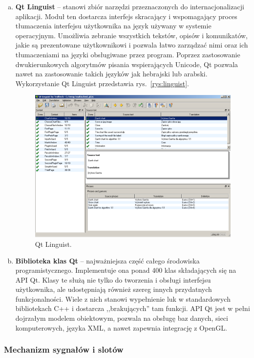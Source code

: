 \begin{enumerate}[a)]
	\item \textbf{Qt Linguist} -- stanowi zbiór narzędzi przeznaczonych do internacjonalizacji aplikacji. Moduł ten dostarcza interfejs skracający i wspomagający 
	proces tłumaczenia interfejsu użytkownika na język używany w systemie operacyjnym. Umożliwia zebranie wszystkich tekstów, opisów i komunikatów, 
	jakie są prezentowane użytkownikowi i pozwala łatwo zarządzać nimi oraz ich tłumaczeniami na języki obsługiwane przez program. Poprzez zastosowanie 
	dwukierunkowych algorytmów pisania wspierających Unicode, Qt pozwala nawet na zastosowanie takich języków jak hebrajski lub arabski. Wykorzystanie Qt Linguist 
	przedstawia rys.~\vref{rys:linguist}.
	\begin{figure}[p]
	\centering\includegraphics[scale=0.4]{figures/linguist.png}
	\caption{Qt Linguist.}\label{rys:linguist}
	\end{figure}
    \afterpage{\clearpage}

	\item \textbf{Biblioteka klas Qt} -- najważniejsza część całego środowiska programistycznego. Implementuje ona ponad 400 klas składających się 
	na API Qt. Klasy te służą nie tylko do tworzenia i obsługi interfejsu użytkownika, ale udostępniają również szereg innych przydatnych 
	funkcjonalności. Wiele z nich stanowi wypełnienie luk w standardowych bibliotekach C++ i dostarcza ,,brakujących'' tam funkcji. API Qt jest 
	w pełni dojrzałym modelem obiektowym, pozwala na obsługę baz danych, sieci komputerowych, języka XML, a nawet zapewnia integrację z OpenGL.	
\end{enumerate}

\subsubsection*{Mechanizm sygnałów i slotów}

